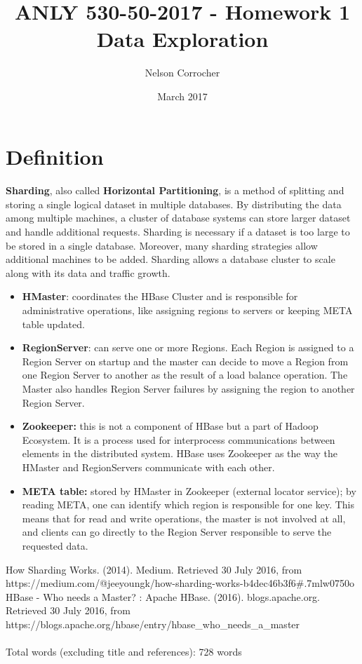 \documentclass[11pt, a4paper]{article}
\title{ANLY 530-50-2017 - Homework 1\\ Data Exploration}
\author{Nelson Corrocher}
\date{March 2017}
\begin{document}
\maketitle
\section{Definition}
\paragraph{}\textbf{Sharding}, also called \textbf{Horizontal Partitioning}, is a method of splitting and storing a single logical dataset in multiple databases. By distributing the data among multiple machines, a cluster of database systems can store larger dataset and handle additional requests. Sharding is necessary if a dataset is too large to be stored in a single database. Moreover, many sharding strategies allow additional machines to be added. Sharding allows a database cluster to scale along with its data and traffic growth.

\begin{itemize}
\item\textbf{HMaster}: coordinates the HBase Cluster and is responsible for administrative operations, like assigning regions to servers or keeping META table updated.
\item\textbf{RegionServer}: can serve one or more Regions. Each Region is assigned to a Region Server on startup and the master can decide to move a Region from one Region Server to another as the result of a load balance operation. The Master also handles Region Server failures by assigning the region to another Region Server.
\item\textbf{Zookeeper:} this is not a component of HBase but a part of Hadoop Ecosystem. It is a process used for interprocess communications between elements in the distributed system. HBase uses Zookeeper as the way the HMaster and RegionServers communicate with each other. 
\item\textbf{META table:} stored by HMaster in Zookeeper (external locator service); by reading META, one can identify which region is responsible for one key. This means that for read and write operations, the master is not involved at all, and clients can go directly to the Region Server responsible to serve the requested data.
\end{itemize}


\begin{thebibliography}{1}
How Sharding Works. (2014). Medium. Retrieved 30 July 2016, from https://medium.com/@jeeyoungk/how-sharding-works-b4dec46b3f6\#.7mlw0750o
HBase - Who needs a Master? : Apache HBase. (2016). blogs.apache.org. Retrieved 30 July 2016, from https://blogs.apache.org/hbase/entry/hbase\_who\_needs\_a\_master

\end{thebibliography}

\paragraph{} Total words (excluding title and references): 728 words
\end{document}
